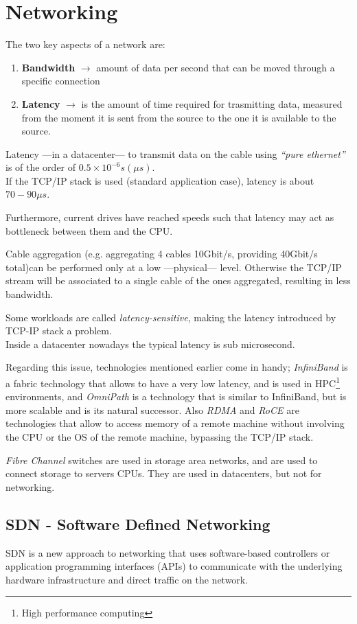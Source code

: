 \chapter{Networking}
The two key aspects of a network are:
\begin{enumerate}
   \item \textbf{Bandwidth} $\longrightarrow$ amount of data per second that can be moved through a specific connection
   \item \textbf{Latency} $\longrightarrow$ is the amount of time required for trasmitting data, measured from the moment it is sent from the source to the one it is available to the source.
\end{enumerate}
Latency ---in a datacenter--- to transmit data on the cable using \textit{``pure ethernet''} is of the order of $0.5\times10^{-6}s (\mu s)$.\\
If the TCP/IP stack is used (standard application case), latency is about $70-90\mu s$.

Furthermore, current drives have reached speeds such that latency may act as bottleneck between them and the CPU.

Cable aggregation (e.g. aggregating 4 cables 10Gbit/s, providing 40Gbit/s total)can be performed only at a low ---physical--- level. Otherwise the TCP/IP stream will be associated to a single cable of the ones aggregated, resulting in less bandwidth.
{
   Some workloads are called \textit{latency-sensitive}, making the latency introduced by TCP-IP stack a problem.\\
   Inside a datacenter nowadays the typical latency is sub microsecond.
   
   Regarding this issue, technologies mentioned earlier come in handy; 
   \textit{InfiniBand} is a fabric technology that allows to have a very low latency, and is used in HPC\footnote{High performance computing} environments, and \textit{OmniPath} is a technology that is similar to InfiniBand, but is more scalable and is its natural successor.
   Also \textit{RDMA} and \textit{RoCE} are technologies that allow to access memory of a remote machine without involving the CPU or the OS of the remote machine, bypassing the TCP/IP stack.
   
   \textit{Fibre Channel} switches are used in storage area networks, and are used to connect storage to servers CPUs. They are used in datacenters, but not for networking.
   }

\section{SDN - Software Defined Networking}
SDN is a new approach to networking that uses software-based controllers or application programming interfaces (APIs) to communicate with the underlying hardware infrastructure and direct traffic on the network.

